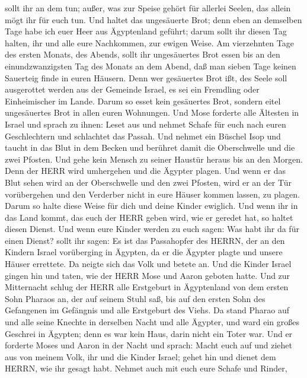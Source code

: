sollt ihr an dem tun; außer, was zur Speise gehört für allerlei Seelen,
das allein mögt ihr für euch tun.  Und haltet das
ungesäuerte Brot; denn eben an demselben Tage habe ich euer Heer aus
Ägyptenland geführt; darum sollt ihr diesen Tag halten, ihr und alle
eure Nachkommen, zur ewigen Weise.  Am vierzehnten Tage des
ersten Monats, des Abends, sollt ihr ungesäuertes Brot essen bis an den
einundzwanzigsten Tag des Monats an dem Abend,  daß man
sieben Tage keinen Sauerteig finde in euren Häusern. Denn wer gesäuertes
Brot ißt, des Seele soll ausgerottet werden aus der Gemeinde Israel, es
sei ein Fremdling oder Einheimischer im Lande.  Darum so
esset kein gesäuertes Brot, sondern eitel ungesäuertes Brot in allen
euren Wohnungen.  Und Mose forderte alle Ältesten in Israel
und sprach zu ihnen: Leset aus und nehmet Schafe für euch nach euren
Geschlechtern und schlachtet das Passah.  Und nehmet ein
Büschel Isop und taucht in das Blut in dem Becken und berühret damit die
Oberschwelle und die zwei Pfosten. Und gehe kein Mensch zu seiner
Haustür heraus bis an den Morgen.  Denn der HERR wird
umhergehen und die Ägypter plagen. Und wenn er das Blut sehen wird an
der Oberschwelle und den zwei Pfosten, wird er an der Tür vorübergehen
und den Verderber nicht in eure Häuser kommen lassen, zu plagen.
 Darum so halte diese Weise für dich und deine Kinder
ewiglich.  Und wenn ihr in das Land kommt, das euch der
HERR geben wird, wie er geredet hat, so haltet diesen Dienst.
 Und wenn eure Kinder werden zu euch sagen: Was habt ihr da
für einen Dienst?  sollt ihr sagen: Es ist das Passahopfer
des HERRN, der an den Kindern Israel vorüberging in Ägypten, da er die
Ägypter plagte und unsere Häuser errettete. Da neigte sich das Volk und
betete an.  Und die Kinder Israel gingen hin und taten, wie
der HERR Mose und Aaron geboten hatte.  Und zur Mitternacht
schlug der HERR alle Erstgeburt in Ägyptenland von dem ersten Sohn
Pharaos an, der auf seinem Stuhl saß, bis auf den ersten Sohn des
Gefangenen im Gefängnis und alle Erstgeburt des Viehs.  Da
stand Pharao auf und alle seine Knechte in derselben Nacht und alle
Ägypter, und ward ein großes Geschrei in Ägypten; denn es war kein Haus,
darin nicht ein Toter war.  Und er forderte Moses und Aaron
in der Nacht und sprach: Macht euch auf und ziehet aus von meinem Volk,
ihr und die Kinder Israel; gehet hin und dienet dem HERRN, wie ihr
gesagt habt.  Nehmet auch mit euch eure Schafe und Rinder,
